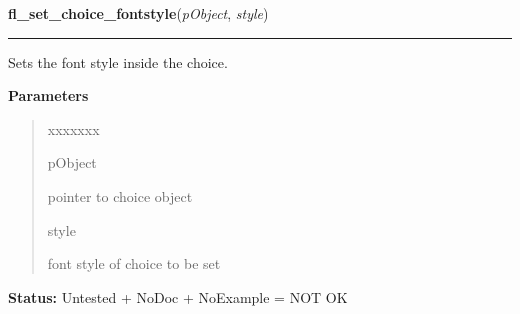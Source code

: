\hspace{.8\funcindent}\begin{boxedminipage}{\funcwidth}

    \raggedright \textbf{fl\_set\_choice\_fontstyle}(\textit{pObject}, \textit{style})

    \vspace{-1.5ex}

    \rule{\textwidth}{0.5\fboxrule}
\setlength{\parskip}{2ex}
    Sets the font style inside the choice.

\setlength{\parskip}{1ex}
      \textbf{Parameters}
      \vspace{-1ex}

      \begin{quote}
        \begin{Ventry}{xxxxxxx}

          \item[pObject]

          pointer to choice object

          \item[style]

          font style of choice to be set

        \end{Ventry}

      \end{quote}

\textbf{Status:} Untested + NoDoc + NoExample = NOT OK



    \end{boxedminipage}

    \label{xformslib:library:fl_set_choice_align}

    \vspace{0.5ex}

